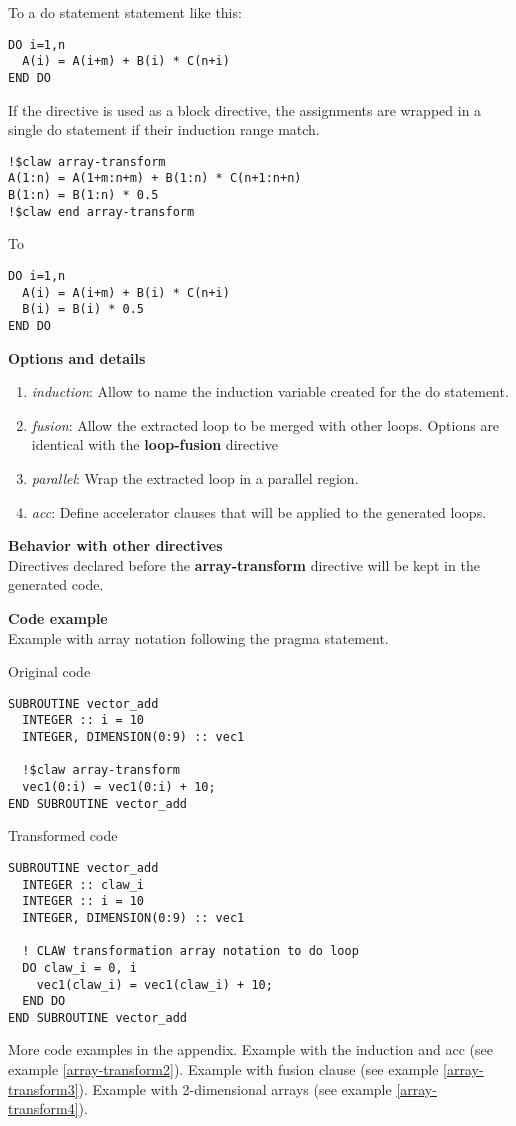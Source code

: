 To a do statement statement like this:

\begin{lstlisting}
DO i=1,n
  A(i) = A(i+m) + B(i) * C(n+i)
END DO
\end{lstlisting}

If the directive is used as a block directive, the assignments are wrapped in
a single do statement if their induction range match.

\begin{lstlisting}
!$claw array-transform
A(1:n) = A(1+m:n+m) + B(1:n) * C(n+1:n+n)
B(1:n) = B(1:n) * 0.5
!$claw end array-transform
\end{lstlisting}

To

\begin{lstlisting}
DO i=1,n
  A(i) = A(i+m) + B(i) * C(n+i)
  B(i) = B(i) * 0.5
END DO
\end{lstlisting}


\textbf{Options and details}
\begin{enumerate}
\item \textit{induction}: Allow to name the induction variable created for the do statement.
\item \textit{fusion}: Allow the extracted loop to be merged with other loops. Options 
are identical with the \textbf{loop-fusion} directive
\item \textit{parallel}: Wrap the extracted loop in a parallel region.
\item \textit{acc}: Define accelerator clauses that will be applied to the generated loops.
\end{enumerate}

\textbf{Behavior with other directives}\\
Directives declared before the \textbf{array-transform} directive will be kept in the
generated code.

\textbf{Code example}\\
\label{array-transform1}
Example with array notation following the pragma statement. 

Original code
\begin{lstlisting}
SUBROUTINE vector_add
  INTEGER :: i = 10
  INTEGER, DIMENSION(0:9) :: vec1

  !$claw array-transform
  vec1(0:i) = vec1(0:i) + 10;
END SUBROUTINE vector_add
\end{lstlisting}

Transformed code
\begin{lstlisting}
SUBROUTINE vector_add
  INTEGER :: claw_i
  INTEGER :: i = 10
  INTEGER, DIMENSION(0:9) :: vec1

  ! CLAW transformation array notation to do loop
  DO claw_i = 0, i
    vec1(claw_i) = vec1(claw_i) + 10;
  END DO
END SUBROUTINE vector_add
\end{lstlisting}

More code examples in the appendix. Example with the induction and acc (see example \ref{array-transform2}). Example with fusion clause (see example \ref{array-transform3}). Example with 2-dimensional arrays (see example \ref{array-transform4}). 

